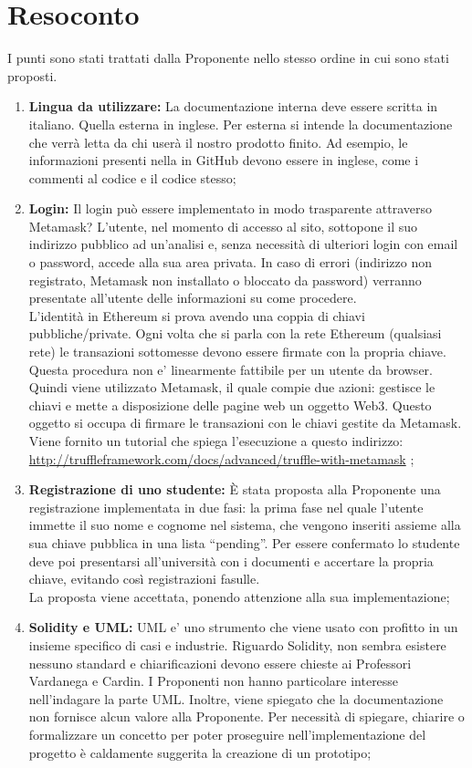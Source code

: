 \documentclass[VER-2017-11-22.tex]{subfiles}
\begin{document}
\chapter{Resoconto}
I punti sono stati trattati dalla Proponente nello stesso ordine in cui sono stati proposti.
\begin{enumerate}
	\item \textbf{Lingua da utilizzare:} La documentazione interna deve essere scritta in italiano. Quella esterna in inglese. Per esterna si intende la documentazione che verrà letta da chi userà il nostro prodotto finito. Ad esempio, le informazioni presenti nella  in GitHub devono essere in inglese, come i commenti al codice e il codice stesso;
	\item \textbf{Login:} Il login può essere implementato in modo trasparente attraverso Metamask? L’utente, nel momento di accesso al sito, sottopone il suo indirizzo pubblico ad un'analisi e, senza necessità di ulteriori login con email o password, accede alla sua area privata. In caso di errori (indirizzo non registrato, Metamask non installato o bloccato da password) verranno presentate all'utente delle informazioni su come procedere.\\	
	L'identità in Ethereum si prova avendo una coppia di chiavi pubbliche/private. Ogni volta che si parla con la rete Ethereum (qualsiasi rete) le transazioni sottomesse devono essere firmate con la propria chiave. Questa procedura non e' linearmente fattibile per un utente da browser. Quindi viene utilizzato Metamask, il quale compie due azioni: gestisce le chiavi e mette a disposizione delle pagine web un oggetto Web3. Questo oggetto si occupa di firmare le transazioni con le chiavi gestite da Metamask. Viene fornito un tutorial che spiega l'esecuzione a questo indirizzo: \href{http://truffleframework.com/docs/advanced/truffle-with-metamask}{http://truffleframework.com/docs/advanced/truffle-with-metamask} ;
	\item \textbf{Registrazione di uno studente:} \`{E} stata proposta alla Proponente una registrazione implementata in due fasi: la prima fase nel quale l’utente immette il suo nome e cognome nel sistema, che vengono inseriti assieme alla sua chiave pubblica in una lista “pending”. Per essere confermato lo studente deve poi presentarsi all’università con i documenti e accertare la propria chiave, evitando così registrazioni fasulle.\\	
	La proposta viene accettata, ponendo attenzione alla sua implementazione;
	\item \textbf{Solidity e UML:} UML e' uno strumento che viene usato con profitto in un insieme specifico di casi e industrie. Riguardo Solidity, non sembra esistere nessuno standard e chiarificazioni devono essere chieste ai Professori Vardanega e Cardin. I Proponenti non hanno particolare interesse nell'indagare la parte UML. Inoltre, viene spiegato che la documentazione non fornisce alcun valore alla Proponente. Per necessità di spiegare, chiarire o formalizzare un concetto per poter proseguire nell'implementazione del progetto è caldamente suggerita la creazione di un prototipo;

\end{enumerate}
\end{document}
